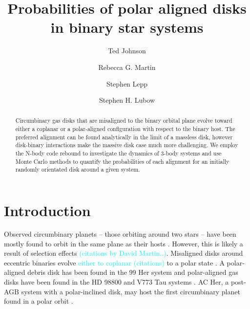 \documentclass[twocolumn]{aastex631}
\newcommand{\RGM}[1]{\textcolor{cyan}{#1}}
\begin{document}
\title{Probabilities of polar aligned disks in binary star systems}

\author[0000-0002-1570-2203]{Ted Johnson}
\author[0000-0003-2401-7168]{Rebecca G. Martin}
\author[0000-0003-2270-1310]{Stephen Lepp}
\author[0000-0002-4636-7348]{Stephen H. Lubow}

\begin{abstract}
    Circumbinary gas disks that are misaligned to the binary orbital plane evolve toward either a coplanar or a polar-aligned configuration with respect to the binary host.
    The preferred alignment can be found analytically
    in the limit of a massless disk, however disk-binary interactions make the massive disk case much more challenging.
    We employ the N-body code {\sc rebound} to investigate the dynamics of  3-body systems and use Monte Carlo methods
    to quantify the probabilities of each alignment for an initially randomly orientated disk around a given system.
\end{abstract}

\section{Introduction}
\label{sec:intro}



Observed circumbinary planets -- those orbiting around two stars -- have been mostly found to orbit in the same plane as
their hosts \citep{doyle2011,orosz2012,welsh2012}. However, this is likely a result of selection effects \RGM{(citations by David Martin..)}.  Misaligned disks around eccentric binaries evolve \RGM{either to coplanar (citations)} to a polar state  \citep{aly2015,martin2017}. A polar-aligned debris disk has been found in the 99 Her system
\citep{kennedy2012} and polar-aligned gas disks have been found in the HD 98800 \citep{kennedy2019} and V773 Tau systems \citep{kenworthy2022}.
AC Her, a post-AGB system with a polar-inclined
disk, may host the first circumbinary planet found in a polar orbit \citep{hillen2015,anugu2023,martin2023}.
\end{document}
